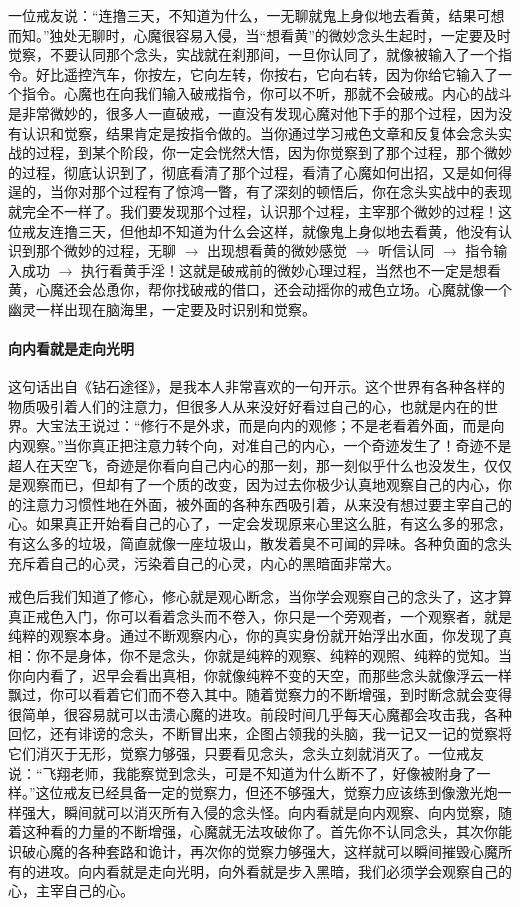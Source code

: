一位戒友说：“连撸三天，不知道为什么，一无聊就鬼上身似地去看黄，结果可想而知。”独处无聊时，心魔很容易入侵，当“想看黄”的微妙念头生起时，一定要及时觉察，不要认同那个念头，实战就在刹那间，一旦你认同了，就像被输入了一个指令。好比遥控汽车，你按左，它向左转，你按右，它向右转，因为你给它输入了一个指令。心魔也在向我们输入破戒指令，你可以不听，那就不会破戒。内心的战斗是非常微妙的，很多人一直破戒，一直没有发现心魔对他下手的那个过程，因为没有认识和觉察，结果肯定是按指令做的。当你通过学习戒色文章和反复体会念头实战的过程，到某个阶段，你一定会恍然大悟，因为你觉察到了那个过程，那个微妙的过程，彻底认识到了，彻底看清了那个过程，看清了心魔如何出招，又是如何得逞的，当你对那个过程有了惊鸿一瞥，有了深刻的顿悟后，你在念头实战中的表现就完全不一样了。我们要发现那个过程，认识那个过程，主宰那个微妙的过程！这位戒友连撸三天，但他却不知道为什么会这样，就像鬼上身似地去看黄，他没有认识到那个微妙的过程，无聊 $\to$ 出现想看黄的微妙感觉 $\to$ 听信认同 $\to$ 指令输入成功 $\to$ 执行看黄手淫！这就是破戒前的微妙心理过程，当然也不一定是想看黄，心魔还会怂恿你，帮你找破戒的借口，还会动摇你的戒色立场。心魔就像一个幽灵一样出现在脑海里，一定要及时识别和觉察。

\paragraph{向内看就是走向光明}

这句话出自《钻石途径》，是我本人非常喜欢的一句开示。这个世界有各种各样的物质吸引着人们的注意力，但很多人从来没好好看过自己的心，也就是内在的世界。大宝法王说过：“修行不是外求，而是向内的观修；不是老看着外面，而是向内观察。”当你真正把注意力转个向，对准自己的内心，一个奇迹发生了！奇迹不是超人在天空飞，奇迹是你看向自己内心的那一刻，那一刻似乎什么也没发生，仅仅是观察而已，但却有了一个质的改变，因为过去你极少认真地观察自己的内心，你的注意力习惯性地在外面，被外面的各种东西吸引着，从来没有想过要主宰自己的心。如果真正开始看自己的心了，一定会发现原来心里这么脏，有这么多的邪念，有这么多的垃圾，简直就像一座垃圾山，散发着臭不可闻的异味。各种负面的念头充斥着自己的心灵，污染着自己的心灵，内心的黑暗面非常大。

戒色后我们知道了修心，修心就是观心断念，当你学会观察自己的念头了，这才算真正戒色入门，你可以看着念头而不卷入，你只是一个旁观者，一个观察者，就是纯粹的观察本身。通过不断观察内心，你的真实身份就开始浮出水面，你发现了真相：你不是身体，你不是念头，你就是纯粹的观察、纯粹的观照、纯粹的觉知。当你向内看了，迟早会看出真相，你就像纯粹不变的天空，而那些念头就像浮云一样飘过，你可以看着它们而不卷入其中。随着觉察力的不断增强，到时断念就会变得很简单，很容易就可以击溃心魔的进攻。前段时间几乎每天心魔都会攻击我，各种回忆，还有诽谤的念头，不断冒出来，企图占领我的头脑，我一记又一记的觉察将它们消灭于无形，觉察力够强，只要看见念头，念头立刻就消灭了。一位戒友说：“飞翔老师，我能察觉到念头，可是不知道为什么断不了，好像被附身了一样。”这位戒友已经具备一定的觉察力，但还不够强大，觉察力应该练到像激光炮一样强大，瞬间就可以消灭所有入侵的念头怪。向内看就是向内观察、向内觉察，随着这种看的力量的不断增强，心魔就无法攻破你了。首先你不认同念头，其次你能识破心魔的各种套路和诡计，再次你的觉察力够强大，这样就可以瞬间摧毁心魔所有的进攻。向内看就是走向光明，向外看就是步入黑暗，我们必须学会观察自己的心，主宰自己的心。

